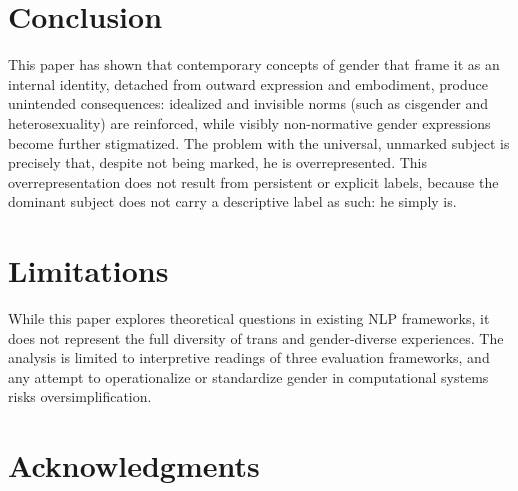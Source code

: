 \documentclass[11pt]{article}
\begin{document}
\section{Conclusion}
This paper has shown that contemporary concepts of gender that frame it as an internal identity, detached from outward expression and embodiment, produce unintended consequences: idealized and invisible norms (such as cisgender and heterosexuality) are reinforced, while visibly non-normative gender expressions become further stigmatized. The problem with the universal, unmarked subject is precisely that, despite not being marked, he is overrepresented. This overrepresentation does not result from persistent or explicit labels, because the dominant subject does not carry a descriptive label as such: he simply is.


\section*{Limitations}

While this paper explores theoretical questions in existing NLP frameworks, it does not represent the full diversity of trans and gender-diverse experiences. The analysis is limited to interpretive readings of three evaluation frameworks, and any attempt to operationalize or standardize gender in computational systems risks oversimplification.

\section*{Acknowledgments}

%


\end{document}
